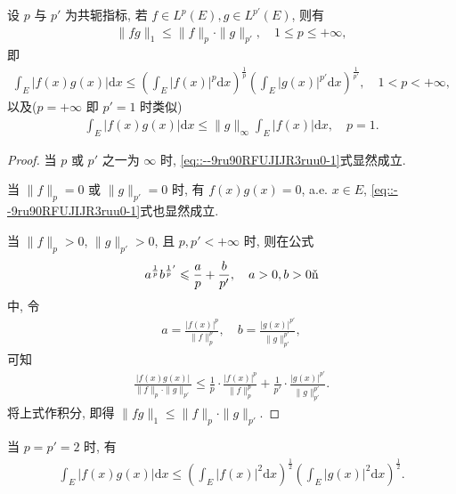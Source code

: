 \documentclass[../../main.tex]{subfiles}%
\begin{document}
\begin{theorem}[Hölder不等式]\label{theorem:实变函数--Hölder不等式}
设 $p$ 与 $p'$ 为共轭指标, 若 $f\in L^p(E), g\in L^{p'}(E)$, 则有
\begin{align}\label{eq::--9ru90RFUJIJR3ruu0-1}
\|fg\|_1 \leqslant \|f\|_p \cdot \|g\|_{p'}, \quad 1\leqslant p\leqslant +\infty,
\end{align}
即
\begin{align*}
\int_E |f(x)g(x)|\mathrm{d}x \leqslant \left( \int_E |f(x)|^p \mathrm{d}x \right)^{\frac{1}{p}} \left( \int_E |g(x)|^{p'} \mathrm{d}x \right)^{\frac{1}{p'}}, \quad 1<p<+\infty,
\end{align*}
以及($p=+\infty$ 即 $p'=1$ 时类似)
\begin{align*}
\int_E |f(x)g(x)|\mathrm{d}x \leqslant \|g\|_\infty \int_E |f(x)|\mathrm{d}x, \quad p=1.
\end{align*}
\end{theorem}
\begin{proof}

当 $p$ 或 $p'$ 之一为 $\infty$ 时, \eqref{eq::--9ru90RFUJIJR3ruu0-1}式显然成立.

当 $\|f\|_p=0$ 或 $\|g\|_{p'}=0$ 时, 有 $f(x)g(x)=0$, a.e. $x\in E$, \eqref{eq::--9ru90RFUJIJR3ruu0-1}式也显然成立.

当 $\|f\|_p>0$, $\|g\|_{p'}>0$, 且 $p,p'<+\infty$ 时, 则在公式
\begin{align*}
a^{\frac{1}{p}}b^{\frac{1}{p}'}\leqslant \frac{a}{p}+\frac{b}{p'}, \quad a>0, b>0 \one
\end{align*}
中, 令
\begin{align*}
a=\frac{|f(x)|^p}{\|f\|_p^p}, \quad b=\frac{|g(x)|^{p'}}{\|g\|_{p'}^{p'}},
\end{align*}
可知
\begin{align*}
\frac{|f(x)g(x)|}{\|f\|_p \cdot \|g\|_{p'}} \leqslant \frac{1}{p} \cdot \frac{|f(x)|^p}{\|f\|_p^p} + \frac{1}{p'} \cdot \frac{|g(x)|^{p'}}{\|g\|_{p'}^{p'}}.
\end{align*}
将上式作积分, 即得 $\|fg\|_1\leqslant \|f\|_p \cdot \|g\|_{p'}$.

\end{proof}

\begin{theorem}\label{theorem:Hölder不等式特例:Schwarz不等式}
当 $p=p'=2$ 时, 有
\begin{align*}
\int_E |f(x)g(x)|\mathrm{d}x \leqslant \left( \int_E |f(x)|^2 \mathrm{d}x \right)^{\frac{1}{2}} \left( \int_E |g(x)|^2 \mathrm{d}x \right)^{\frac{1}{2}}.
\end{align*}
\end{theorem}
\end{document}
